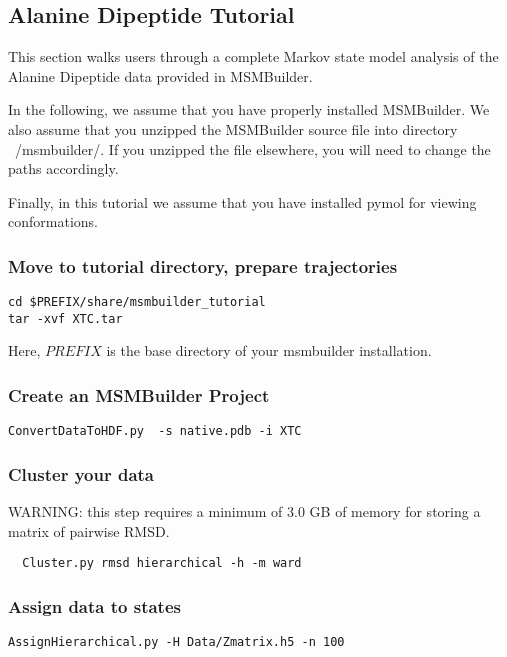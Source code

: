 \documentclass[12pt]{article}
\begin{document}
\subsection{Alanine Dipeptide Tutorial}

This section walks users through a complete Markov state model analysis of the Alanine Dipeptide data provided in MSMBuilder.

In the following, we assume that you have properly installed MSMBuilder.  We also assume that you unzipped the MSMBuilder source file into directory ~/msmbuilder/.  If you unzipped the file elsewhere, you will need to change the paths accordingly.  

Finally, in this tutorial we assume that you have installed pymol for viewing conformations.

\subsubsection{Move to tutorial directory, prepare trajectories}
\begin{verbatim}
cd $PREFIX/share/msmbuilder_tutorial 
tar -xvf XTC.tar
\end{verbatim}

Here, $PREFIX$ is the base directory of your msmbuilder installation.

\subsubsection{Create an MSMBuilder Project}
\begin{verbatim}
ConvertDataToHDF.py  -s native.pdb -i XTC
\end{verbatim}

\subsubsection{Cluster your data}
WARNING: this step requires a minimum of 3.0 GB of memory for storing a matrix of pairwise RMSD.
\begin{verbatim}
  Cluster.py rmsd hierarchical -h -m ward
\end{verbatim}

\subsubsection{Assign data to states}

\begin{verbatim}
AssignHierarchical.py -H Data/Zmatrix.h5 -n 100
\end{verbatim}
\end{document}
